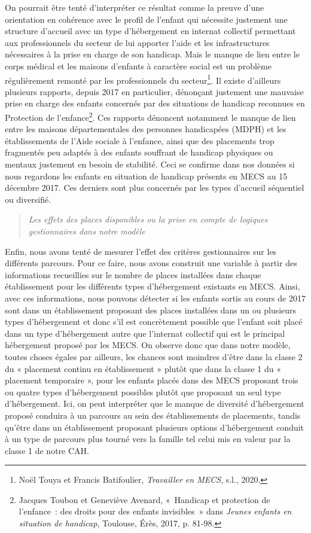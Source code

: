 \documentclass[
  12,
  a4paper,
]{report}
\begin{document}
On pourrait être tenté d'interpréter ce résultat comme la preuve d'une
orientation en cohérence avec le profil de l'enfant qui nécessite
justement une structure d'accueil avec un type d'hébergement en internat
collectif permettant aux professionnels du secteur de lui apporter
l'aide et les infrastructures nécessaires à la prise en charge de son
handicap. Mais le manque de lien entre le corps médical et les maisons
d'enfants à caractère social est un problème régulièrement remonté par
les professionnels du secteur\footnote{Noël Touya et Francis
  Batifoulier, \emph{Travailler en MECS}, s.l., 2020.}. Il existe
d'ailleurs plusieurs rapports, depuis 2017 en particulier, dénonçant
justement une mauvaise prise en charge des enfants concernés par des
situations de handicap reconnues en Protection de l'enfance\footnote{Jacques
  Toubon et Geneviève Avenard, {«~Handicap et protection de l'enfance~:
  des droits pour des enfants invisibles~»} dans \emph{Jeunes enfants en
  situation de handicap}, {Toulouse}, {Érès}, 2017, p. 81‑98.}. Ces
rapports dénoncent notamment le manque de lien entre les maisons
départementales des personnes handicapées (MDPH) et les établissements
de l'Aide sociale à l'enfance, ainsi que des placements trop fragmentés
peu adaptés à des enfants souffrant de handicap physiques ou mentaux
justement en besoin de stabilité. Ceci se confirme dans nos données si
nous regardons les enfants en situation de handicap présents en MECS au
15 décembre 2017. Ces derniers sont plus concernés par les types
d'accueil séquentiel ou diversifié.

\begin{quote}
\emph{Les effets des places disponibles ou la prise en compte de
logiques gestionnaires dans notre modèle}
\end{quote}

Enfin, nous avons tenté de mesurer l'effet des critères gestionnaires
sur les différents parcours. Pour ce faire, nous avons construit une
variable à partir des informations recueillies sur le nombre de places
installées dans chaque établissement pour les différents types
d'hébergement existants en MECS. Ainsi, avec ces informations, nous
pouvons détecter si les enfants sortis au cours de 2017 sont dans un
établissement proposant des places installées dans un ou plusieurs types
d'hébergement et donc s'il est concrètement possible que l'enfant soit
placé dans un type d'hébergement autre que l'internat collectif qui est
le principal hébergement proposé par les MECS. On observe donc que dans
notre modèle, toutes choses égales par ailleurs, les chances sont
moindres d'être dans la classe 2 du « placement continu en établissement
» plutôt que dans la classe 1 du « placement temporaire », pour les
enfants placés dans des MECS proposant trois ou quatre types
d'hébergement possibles plutôt que proposant un seul type d'hébergement.
Ici, on peut interpréter que le manque de diversité d'hébergement
proposé conduira à un parcours au sein des établissements de placements,
tandis qu'être dans un établissement proposant plusieurs options
d'hébergement conduit à un type de parcours plus tourné vers la famille
tel celui mis en valeur par la classe 1 de notre CAH.
\end{document}
